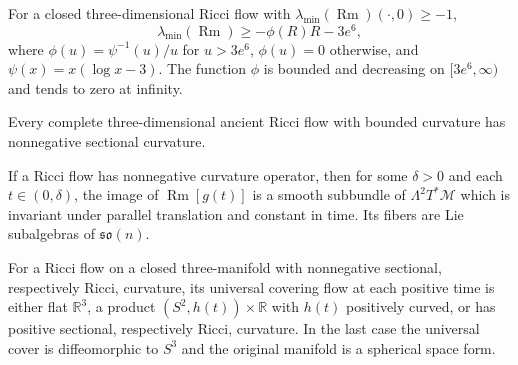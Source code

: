 \begin{corollary}
\label{cor:chow-ii-appd-almost-nonnegative-curvature}
For a closed three-dimensional Ricci flow with
$\lambda_{\min}(\operatorname{Rm})(\cdot,0)\geq-1$,
\[
 \lambda_{\min}(\operatorname{Rm})\geq-\phi(R)R-3e^6,
\]
where $\phi(u)=\psi^{-1}(u)/u$ for $u>3e^6$, $\phi(u)=0$ otherwise, and
$\psi(x)=x(\log x-3)$. The function $\phi$ is bounded and decreasing on
$[3e^6,\infty)$ and tends to zero at infinity.
\end{corollary}

\begin{lemma}
\label{lem:chow-ii-appd-ancient-three-dimensional-nonnegative}
Every complete three-dimensional ancient Ricci flow with bounded curvature
has nonnegative sectional curvature.
\end{lemma}

\begin{theorem}
\label{thm:chow-ii-appd-curvature-operator-strong-maximum-principle}
If a Ricci flow has nonnegative curvature operator, then for some $\delta>0$
and each $t\in(0,\delta)$, the image of $\operatorname{Rm}[g(t)]$ is a smooth
subbundle of $\Lambda^2T^*\mathcal M$ which is invariant under parallel
translation and constant in time. Its fibers are Lie subalgebras of
$\mathfrak{so}(n)$.
\end{theorem}

\begin{theorem}
\label{thm:chow-ii-appd-three-manifold-curvature-rigidity}
For a Ricci flow on a closed three-manifold with nonnegative sectional,
respectively Ricci, curvature, its universal covering flow at each positive
time is either flat $\mathbb R^3$, a product $(S^2,h(t))\times\mathbb R$ with
$h(t)$ positively curved, or has positive sectional, respectively Ricci,
curvature. In the last case the universal cover is diffeomorphic to $S^3$ and
the original manifold is a spherical space form.
\end{theorem}

